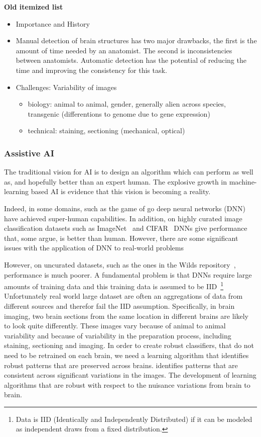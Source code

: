 \documentclass[runningheads]{llncs}
\begin{document}
{\bf Old itemized list}\\
\begin{itemize}
\item Importance and History
\item Manual detection of brain structures has two major drawbacks, the first is the amount of time needed by an anatomist. The second is inconsistencies between anatomists. Automatic detection has the potential of reducing the time and improving the consistency for this task.
\item Challenges: Variability of images
    \begin{itemize}
        \item biology: animal to animal, gender, generally alien across species, transgenic (differentions to genome due to gene expression)
        \item technical: staining, sectioning (mechanical, optical)
    \end{itemize}
  \end{itemize}
  
\subsubsection{Assistive AI} The traditional vision for AI is to design
an algorithm which can perform as well as, and hopefully better than
an expert human. The explosive growth in machine-learning based AI is
evidence that this vision is becoming a reality.

Indeed, in some domains, such as the game of go \cite{} deep neural
networks (DNN)  have achieved super-human capabilities. In addition,
on highly curated image classification datasets such as ImageNet~\cite{} and
CIFAR~\cite{} DNNs give performance that, some argue, is better than
human. However, there are some significant issues with the application
of DNN to real-world problems 

However, on uncurated datasets, such as the ones in the Wilds
repository~\cite{wilds, web-site}, performance is much poorer.  A
fundamental problem is that DNNs require large amounts of training
data and this training data is assumed to be IID~\footnote{Data is IID
  (Identically and Independently Distributed) if it can be modeled as
  independent draws from a fixed distribution.}  Unfortunately real
world large dataset are often an aggregations of data from different
sources and therefor fail the IID assumption. Specifically, in brain imaging,
two brain sections from the same location in different brains are
likely to look quite differently.  These images vary
because of animal to animal variability and because of
variability in the preparation process, including staining, sectioning
and imaging. In order to create robust classifiers, that do not need
to be retrained on each brain, we need a learning algorithm that
identifies robust patterns that are preserved across brains.
identifies patterns that are consistent across significant variations
in the images.  The development of learning algorithms that are robust
with respect to the nuisance variations from brain to brain.
\end{document}
